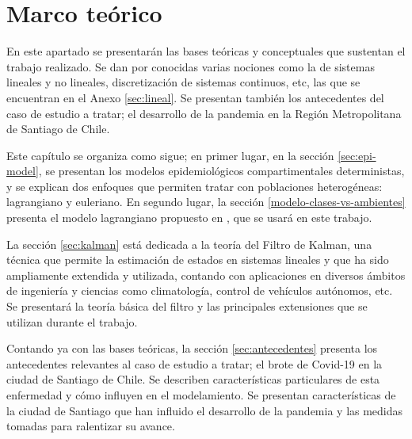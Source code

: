 \chapter{Marco teórico}\label{chap:marco}



En este apartado se presentarán las bases teóricas y conceptuales que sustentan el trabajo realizado. Se dan por conocidas varias nociones como la de sistemas lineales y no lineales, discretización de sistemas continuos, etc, las que se encuentran en el Anexo \ref{sec:lineal}. Se presentan también los antecedentes del caso de estudio a tratar; el desarrollo de la pandemia en la Región Metropolitana de Santiago de Chile.

Este capítulo se organiza como sigue; en primer lugar, en la sección \ref{sec:epi-model}, se presentan los modelos epidemiológicos compartimentales deterministas, y se explican dos enfoques que permiten tratar con poblaciones heterogéneas: lagrangiano y euleriano. En segundo lugar, la sección \ref{modelo-clases-vs-ambientes} presenta el modelo lagrangiano propuesto en \cite{Bichara2018}, que se usará en este trabajo.


La sección \ref{sec:kalman} está dedicada a la teoría del Filtro de Kalman, una técnica que permite la estimación de estados en sistemas lineales y que ha sido ampliamente extendida y utilizada, contando con aplicaciones en diversos ámbitos de ingeniería y ciencias como climatología, control de vehículos autónomos, etc. Se presentará la teoría básica del filtro y las principales extensiones que se utilizan durante el trabajo.

Contando ya con las bases teóricas, la sección \ref{sec:antecedentes} presenta los antecedentes relevantes al caso de estudio a tratar; el brote de Covid-19 en la ciudad de Santiago de Chile. Se describen características particulares de esta enfermedad y cómo influyen en el modelamiento. Se presentan características de la ciudad de Santiago que han influido el desarrollo de la pandemia y las medidas tomadas para ralentizar su avance.


